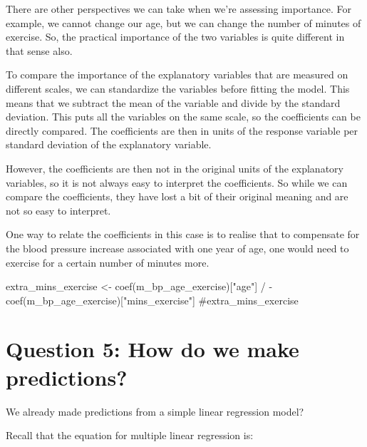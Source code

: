 \documentclass[
  letterpaper,
  8pt,
  a4paper]{book}
\newenvironment{Shaded}{\begin{snugshade}}{\end{snugshade}}
\newcommand{\CommentTok}[1]{\textcolor[rgb]{0.37,0.37,0.37}{#1}}
\newcommand{\FunctionTok}[1]{\textcolor[rgb]{0.28,0.35,0.67}{#1}}
\newcommand{\NormalTok}[1]{\textcolor[rgb]{0.00,0.23,0.31}{#1}}
\newcommand{\OtherTok}[1]{\textcolor[rgb]{0.00,0.23,0.31}{#1}}
\newcommand{\SpecialCharTok}[1]{\textcolor[rgb]{0.37,0.37,0.37}{#1}}
\newcommand{\StringTok}[1]{\textcolor[rgb]{0.13,0.47,0.30}{#1}}
\begin{document}
There are other perspectives we can take when we're assessing
importance. For example, we cannot change our age, but we can change the
number of minutes of exercise. So, the practical importance of the two
variables is quite different in that sense also.

To compare the importance of the explanatory variables that are measured
on different scales, we can standardize the variables before fitting the
model. This means that we subtract the mean of the variable and divide
by the standard deviation. This puts all the variables on the same
scale, so the coefficients can be directly compared. The coefficients
are then in units of the response variable per standard deviation of the
explanatory variable.

However, the coefficients are then not in the original units of the
explanatory variables, so it is not always easy to interpret the
coefficients. So while we can compare the coefficients, they have lost a
bit of their original meaning and are not so easy to interpret.

One way to relate the coefficients in this case is to realise that to
compensate for the blood pressure increase associated with one year of
age, one would need to exercise for a certain number of minutes more.

\begin{Shaded}
\begin{Highlighting}[]
\NormalTok{extra\_mins\_exercise }\OtherTok{\textless{}{-}} \FunctionTok{coef}\NormalTok{(m\_bp\_age\_exercise)[}\StringTok{"age"}\NormalTok{] }\SpecialCharTok{/} \SpecialCharTok{{-}}\FunctionTok{coef}\NormalTok{(m\_bp\_age\_exercise)[}\StringTok{"mins\_exercise"}\NormalTok{]}
\CommentTok{\#extra\_mins\_exercise}
\end{Highlighting}
\end{Shaded}

\section*{Question 5: How do we make
predictions?}\label{question-5-how-do-we-make-predictions}


We already made predictions from a simple linear regression model?

Recall that the equation for multiple linear regression is:
\end{document}
